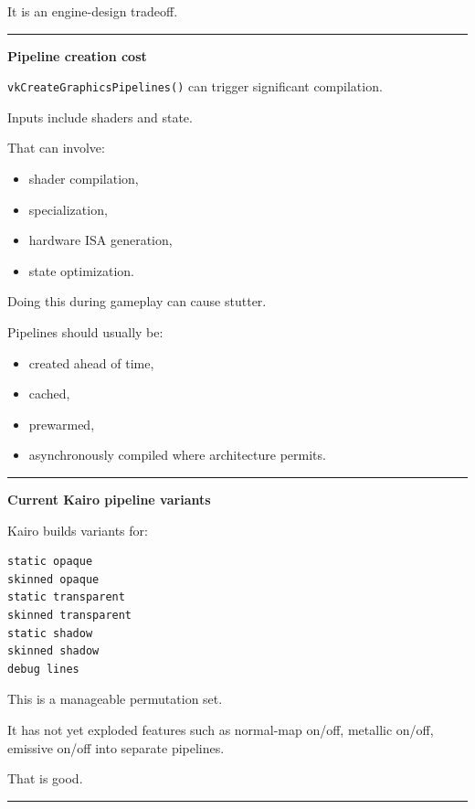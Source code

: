 It is an engine-design tradeoff.

\begin{center}\rule{0.5\linewidth}{0.5pt}\end{center}

\textbf{Pipeline creation cost}

\texttt{vkCreateGraphicsPipelines()} can trigger significant compilation.

Inputs include shaders and state.

That can involve:

\begin{itemize}
\tightlist
\item
  shader compilation,
\item
  specialization,
\item
  hardware ISA generation,
\item
  state optimization.
\end{itemize}

Doing this during gameplay can cause stutter.

Pipelines should usually be:

\begin{itemize}
\tightlist
\item
  created ahead of time,
\item
  cached,
\item
  prewarmed,
\item
  asynchronously compiled where architecture permits.
\end{itemize}

\begin{center}\rule{0.5\linewidth}{0.5pt}\end{center}

\textbf{Current Kairo pipeline variants}

Kairo builds variants for:

\begin{verbatim}
static opaque
skinned opaque
static transparent
skinned transparent
static shadow
skinned shadow
debug lines
\end{verbatim}

This is a manageable permutation set.

It has not yet exploded features such as normal-map on/off, metallic on/off, emissive on/off into separate pipelines.

That is good.

\begin{center}\rule{0.5\linewidth}{0.5pt}\end{center}

